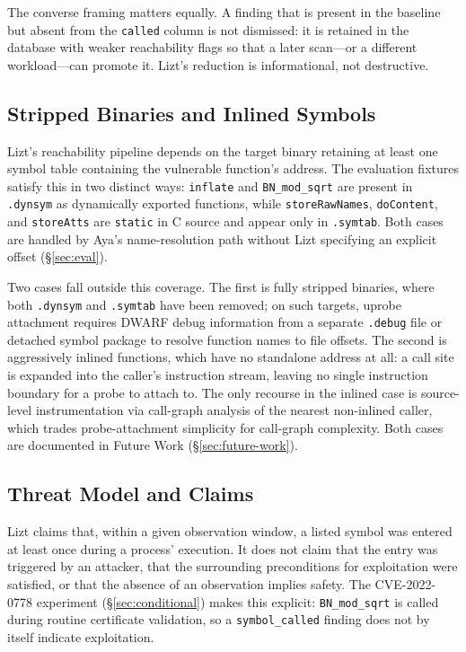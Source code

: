 \documentclass[conference]{IEEEtran}
\begin{document}
The converse framing matters equally.
A finding that is present in the baseline but absent from the \texttt{called} column is not dismissed: it is retained in the database with weaker reachability flags so that a later scan---or a different workload---can promote it.
Lizt's reduction is informational, not destructive.

\subsection{Stripped Binaries and Inlined Symbols}
\label{sec:static-inlined}

Lizt's reachability pipeline depends on the target binary retaining at least one symbol table containing the vulnerable function's address.
The evaluation fixtures satisfy this in two distinct ways: \texttt{inflate} and \texttt{BN\_mod\_sqrt} are present in \texttt{.dynsym} as dynamically exported functions, while \texttt{storeRawNames}, \texttt{doContent}, and \texttt{storeAtts} are \texttt{static} in C source and appear only in \texttt{.symtab}.
Both cases are handled by Aya's name-resolution path without Lizt specifying an explicit offset (\S\ref{sec:eval}).

Two cases fall outside this coverage.
The first is fully stripped binaries, where both \texttt{.dynsym} and \texttt{.symtab} have been removed; on such targets, uprobe attachment requires DWARF debug information from a separate \texttt{.debug} file or detached symbol package to resolve function names to file offsets.
The second is aggressively inlined functions, which have no standalone address at all: a call site is expanded into the caller's instruction stream, leaving no single instruction boundary for a probe to attach to.
The only recourse in the inlined case is source-level instrumentation via call-graph analysis of the nearest non-inlined caller, which trades probe-attachment simplicity for call-graph complexity.
Both cases are documented in Future Work (\S\ref{sec:future-work}).

\subsection{Threat Model and Claims}
\label{sec:threat-model}

Lizt claims that, within a given observation window, a listed symbol was entered at least once during a process' execution.
It does not claim that the entry was triggered by an attacker, that the surrounding preconditions for exploitation were satisfied, or that the absence of an observation implies safety.
The CVE-2022-0778 experiment (\S\ref{sec:conditional}) makes this explicit: \texttt{BN\_mod\_sqrt} is called during routine certificate validation, so a \texttt{symbol\_called} finding does not by itself indicate exploitation.
\end{document}
